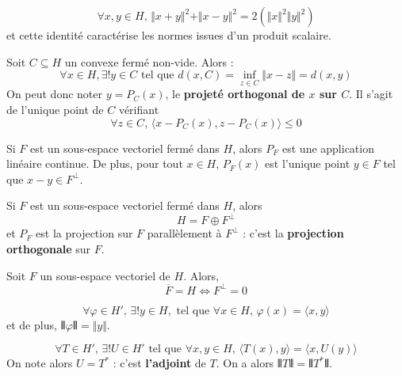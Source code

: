   \begin{lemma}
    \[ \forall x, y \in H, \, \Vert x + y \Vert^2 + \Vert x - y \Vert^2 = 2(\Vert x \Vert^2 \Vert y \Vert^2) \]
    et cette identité caractérise les normes issues d'un produit scalaire.
  \end{lemma}


  \begin{theorem}
    Soit $C \subseteq H$ un convexe fermé non-vide. Alors :
    \[ \forall x \in H, \exists! y \in C \text{ tel que } d(x, C) = \inf_{z \in C} \Vert x - z \Vert = d(x, y) \]
    On peut donc noter $y = P_C(x)$, le \textbf{projeté orthogonal de $x$ sur $C$}. Il s'agit de l'unique point de $C$ vérifiant
    \[ \forall z \in C, \, \langle x - P_C(x), z - P_C(x) \rangle \leq 0 \]
  \end{theorem}

  \begin{theorem}
    Si $F$ est un sous-espace vectoriel fermé dans $H$, alors $P_F$ est une application linéaire continue. De plus, pour tout $x \in H$, $P_F(x)$ est l'unique point $y \in F$ tel que $x-y \in F^\perp$.
  \end{theorem}

  \begin{theorem}
    Si $F$ est un sous-espace vectoriel fermé dans $H$, alors
    \[ H = F \oplus F^\perp \]
    et $P_F$ est la projection sur $F$ parallèlement à $F^\perp$ : c'est la \textbf{projection orthogonale} sur $F$.
  \end{theorem}

  \begin{corollary}
    Soit $F$ un sous-espace vectoriel de $H$. Alors,
    \[ \overline{F} = H \iff F^\perp = 0 \]
  \end{corollary}

  \begin{theorem}
    \[ \forall \varphi \in H', \, \exists! y \in H, \text{ tel que } \forall x \in H, \, \varphi(x) = \langle x, y \rangle \]
    et de plus, $\VERT \varphi \VERT = \Vert y \Vert$.
  \end{theorem}

  \begin{corollary}
    \[ \forall T \in H', \, \exists! U \in H' \text{ tel que } \forall x, y \in H, \, \langle T(x), y \rangle = \langle x, U(y) \rangle \]
    On note alors $U = T^*$ : c'est \textbf{l'adjoint} de $T$. On a alors $\VERT T \VERT = \VERT T^* \VERT$.
  \end{corollary}

